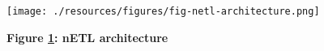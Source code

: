 \begin{figure}[H]
    \centering
    \begin{mdframed}
        \centering
        \texttt{[image: ./resources/figures/fig-netl-architecture.png]}
    \end{mdframed}
    \caption[nETL Architecture]{\textbf{Figure \ref{fig-nETL}: nETL architecture}}
    \label{fig-nETL}
\end{figure}